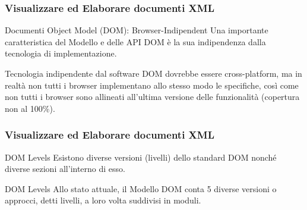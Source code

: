 \begin{frame}
    \frametitle{Visualizzare ed Elaborare documenti XML}
    \addtocounter{nframe}{1}
    

     \begin{block}{Documenti Object Model (DOM): Browser-Indipendent}
        Una importante caratteristica del Modello e delle API DOM è la sua indipendenza dalla tecnologia di implementazione.
        
     \end{block}

     \begin{block}{Tecnologia indipendente dal software}
        DOM dovrebbe essere cross-platform, ma in realtà non tutti i browser implementano allo stesso modo le specifiche, così come non tutti i browser sono allineati all'ultima versione delle funzionalità (copertura non al 100\%).
       
     \end{block}
     
\end{frame}


\begin{frame}
    \frametitle{Visualizzare ed Elaborare documenti XML}
    \addtocounter{nframe}{1}
    

     \begin{block}{DOM Levels}
       Esistono diverse versioni (livelli) dello standard DOM nonché diverse sezioni all'interno di esso.
     \end{block}

     \begin{block}{DOM Levels}
       Allo stato attuale, il Modello DOM conta 5 diverse versioni o approcci, detti livelli, a loro volta suddivisi in moduli.
     \end{block}
     
\end{frame}

